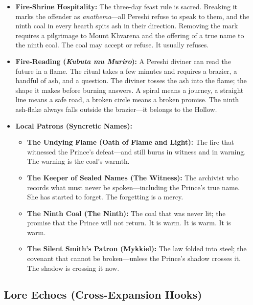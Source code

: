 \begin{itemize}
\item \textbf{Fire-Shrine Hospitality:} The three-day feast rule is sacred. Breaking it marks the offender as \textit{anathema}---all Pereshi refuse to speak to them, and the ninth coal in every hearth spits ash in their direction. Removing the mark requires a pilgrimage to Mount Khvarena and the offering of a true name to the ninth coal. The coal may accept or refuse. It usually refuses.
\item \textbf{Fire-Reading (\textit{Kubuta mu Muriro}):} A Pereshi diviner can read the future in a flame. The ritual takes a few minutes and requires a brazier, a handful of ash, and a question. The diviner tosses the ash into the flame; the shape it makes before burning answers. A spiral means a journey, a straight line means a safe road, a broken circle means a broken promise. The ninth ash-flake always falls outside the brazier---it belongs to the Hollow.
\item \textbf{Local Patrons (Syncretic Names):}
  \begin{itemize}
    \item \textbf{The Undying Flame (Oath of Flame and Light):} The fire that witnessed the Prince's defeat---and still burns in witness and in warning. The warning is the coal's warmth.
    \item \textbf{The Keeper of Sealed Names (The Witness):} The archivist who records what must never be spoken---including the Prince's true name. She has started to forget. The forgetting is a mercy.
    \item \textbf{The Ninth Coal (The Ninth):} The coal that was never lit; the promise that the Prince will not return. It is warm. It is warm. It is warm.
    \item \textbf{The Silent Smith's Patron (Mykkiel):} The law folded into steel; the covenant that cannot be broken---unless the Prince's shadow crosses it. The shadow is crossing it now.
  \end{itemize}
\end{itemize}

\subsection*{Lore Echoes (Cross-Expansion Hooks)}
\label{sec:pereshi-lore}

